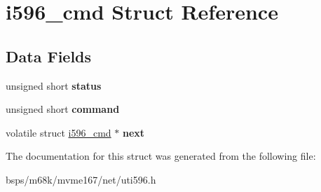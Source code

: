 \hypertarget{structi596__cmd}{}\section{i596\+\_\+cmd Struct Reference}
\label{structi596__cmd}
\subsection*{Data Fields}
\begin{DoxyCompactItemize}
\item 
\mbox{\label{structi596__cmd_ae24e835d69829b4c7e96963c98380a6f}} 
unsigned short {\bfseries status}
\item 
\mbox{\label{structi596__cmd_a32c4f39e2b9dbb36bf7e3b8942958bec}} 
unsigned short {\bfseries command}
\item 
\mbox{\label{structi596__cmd_a18df8bca0d6d2575711051f102f9fd35}} 
volatile struct \mbox{\hyperlink{structi596__cmd}{i596\+\_\+cmd}} $\ast$ {\bfseries next}
\end{DoxyCompactItemize}


The documentation for this struct was generated from the following file\+:\begin{DoxyCompactItemize}
\item 
bsps/m68k/mvme167/net/uti596.\+h\end{DoxyCompactItemize}
